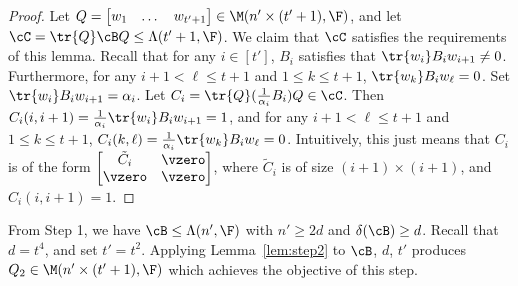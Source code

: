 \begin{proof}
Let $Q=\begin{bmatrix} w_1 & \dots & 
w_{t'+1}\end{bmatrix}\in\M(n'\times(t'+1),\F)$, 
and let $\cC=\tr{Q}\cB Q\leq\Lambda(t'+1, \F)$. We claim that $\cC$ satisfies the 
requirements of this lemma. Recall that for any $i\in[t']$, $B_i$ satisfies that 
$\tr{w_i}B_iw_{i+1}\neq 0$. Furthermore, for any $i+1<\ell\leq t+1$ and $1\leq 
k\leq 
t+1$, $\tr{w_k}B_iw_\ell=0$. Set $\tr{w_i}B_iw_{i+1}=\alpha_i$. Let
$C_i=\tr{Q}(\frac{1}{\alpha_i} B_i)Q\in \cC$. Then $C_i(i, 
i+1)=\frac{1}{\alpha_i}\tr{w_i}B_iw_{i+1}=1$, and for any $i+1<\ell\leq t+1$ and 
$1\leq k\leq t+1$, $C_i(k, \ell)=\frac{1}{\alpha_i}\tr{w_k}B_iw_\ell=0$. 
Intuitively, this just 
means 
that $C_i$ is of the form $\begin{bmatrix}
\tilde C_i & \vzero\\
\vzero & \vzero
\end{bmatrix}$, where $\tilde C_i$ is of size $(i+1)\times (i+1)$, and $C_i(i, 
i+1)=1$. 
\end{proof}

From Step 1, we have $\cB\leq\Lambda(n', \F)$ with 
$n'\geq 
2d$ and $\delta(\cB)\geq d$. Recall that $d=t^4$, and set $t'=t^2$. Applying 
Lemma~\ref{lem:step2} to $\cB$, $d$, $t'$ produces $Q_2\in\M(n'\times(t'+1), \F)$ 
which achieves the objective of this step. 

